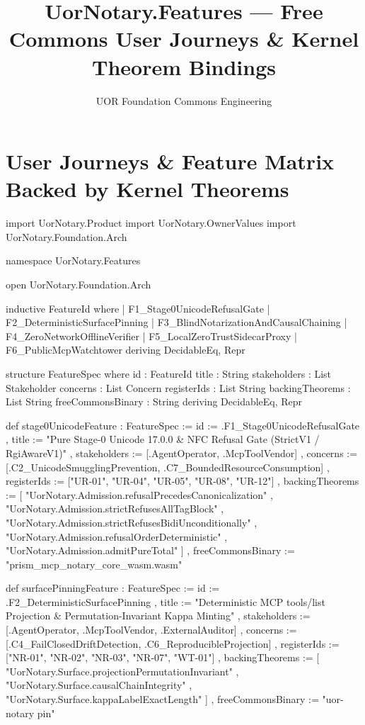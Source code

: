 \documentclass[12pt]{lexlean}
\title{UorNotary.Features --- Free Commons User Journeys \& Kernel Theorem Bindings}
\author{UOR Foundation Commons Engineering}
\begin{document}
\maketitle

\section{User Journeys \& Feature Matrix Backed by Kernel Theorems}

\begin{lean}
import UorNotary.Product
import UorNotary.OwnerValues
import UorNotary.Foundation.Arch

namespace UorNotary.Features

open UorNotary.Foundation.Arch

inductive FeatureId where
  | F1_Stage0UnicodeRefusalGate
  | F2_DeterministicSurfacePinning
  | F3_BlindNotarizationAndCausalChaining
  | F4_ZeroNetworkOfflineVerifier
  | F5_LocalZeroTrustSidecarProxy
  | F6_PublicMcpWatchtower
deriving DecidableEq, Repr

structure FeatureSpec where
  id                : FeatureId
  title             : String
  stakeholders      : List Stakeholder
  concerns          : List Concern
  registerIds       : List String
  backingTheorems   : List String
  freeCommonsBinary : String
deriving DecidableEq, Repr

def stage0UnicodeFeature : FeatureSpec :=
  { id              := .F1_Stage0UnicodeRefusalGate
  , title           := "Pure Stage-0 Unicode 17.0.0 & NFC Refusal Gate (StrictV1 / RgiAwareV1)"
  , stakeholders    := [.AgentOperator, .McpToolVendor]
  , concerns        := [.C2_UnicodeSmugglingPrevention, .C7_BoundedResourceConsumption]
  , registerIds     := ["UR-01", "UR-04", "UR-05", "UR-08", "UR-12"]
  , backingTheorems :=
      [ "UorNotary.Admission.refusalPrecedesCanonicalization"
      , "UorNotary.Admission.strictRefusesAllTagBlock"
      , "UorNotary.Admission.strictRefusesBidiUnconditionally"
      , "UorNotary.Admission.refusalOrderDeterministic"
      , "UorNotary.Admission.admitPureTotal"
      ]
  , freeCommonsBinary := "prism_mcp_notary_core_wasm.wasm"
  }

def surfacePinningFeature : FeatureSpec :=
  { id              := .F2_DeterministicSurfacePinning
  , title           := "Deterministic MCP tools/list Projection & Permutation-Invariant Kappa Minting"
  , stakeholders    := [.AgentOperator, .McpToolVendor, .ExternalAuditor]
  , concerns        := [.C4_FailClosedDriftDetection, .C6_ReproducibleProjection]
  , registerIds     := ["NR-01", "NR-02", "NR-03", "NR-07", "WT-01"]
  , backingTheorems :=
      [ "UorNotary.Surface.projectionPermutationInvariant"
      , "UorNotary.Surface.causalChainIntegrity"
      , "UorNotary.Surface.kappaLabelExactLength"
      ]
  , freeCommonsBinary := "uor-notary pin"
  }


\end{lean}
\end{document}
